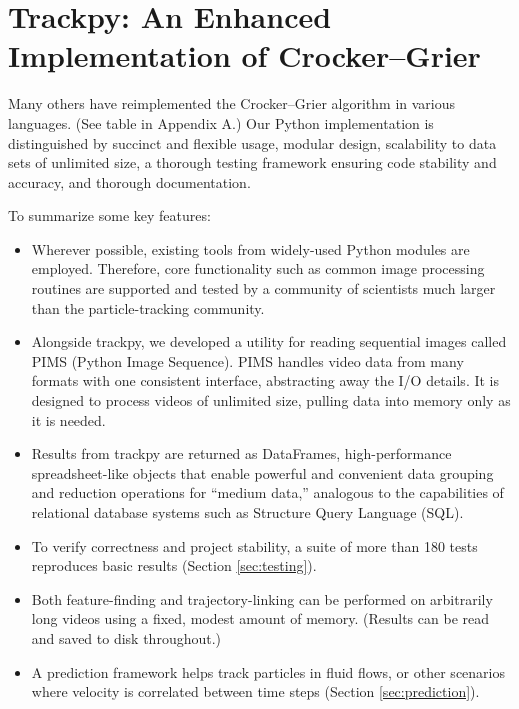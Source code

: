 \section{Trackpy: An Enhanced Implementation of Crocker--Grier}

Many others have reimplemented the Crocker--Grier algorithm in various languages. (See table in Appendix A.) Our Python implementation is distinguished by succinct and flexible usage, modular design, scalability to data sets of unlimited size, a thorough testing framework ensuring code stability and accuracy, and thorough documentation.

To summarize some key features:
\begin{itemize}

\item Wherever possible, existing tools from widely-used Python modules are employed. Therefore, core functionality such as common image processing routines are supported and tested by a community of scientists much larger than the particle-tracking community.

\item Alongside trackpy, we developed a utility for reading sequential images called PIMS (Python Image Sequence). PIMS handles video data from many formats with one consistent interface, abstracting away the I/O details. It is designed to process videos of unlimited size, pulling data into memory only as it is needed.

\item Results from trackpy are returned as DataFrames, high-performance spreadsheet-like objects that enable powerful and convenient data grouping and reduction operations for ``medium data,'' analogous to the capabilities of relational database systems such as Structure Query Language (SQL).

\item To verify correctness and project stability, a suite of more than 180 tests reproduces basic results (Section \ref{sec:testing}).

\item Both feature-finding and trajectory-linking can be performed on arbitrarily long videos using a fixed, modest amount of memory. (Results can be read and saved to disk throughout.)

\item A prediction framework helps track particles in fluid flows, or other scenarios where velocity is correlated between time steps (Section \ref{sec:prediction}).


\end{itemize}
